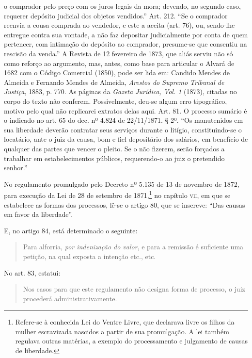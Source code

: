 {  o comprador pelo preço com os juros legais da mora; devendo, no
  segundo caso, requerer depósito judicial dos objetos vendidos.'' Art.
  212. ``Se o comprador reenvia a cousa comprada ao vendedor, e este a
  aceita (art. 76), ou, sendo-lhe entregue contra sua vontade, a não faz
  depositar judicialmente por conta de quem pertencer, com intimação do
  depósito ao comprador, presume-se que consentiu na rescisão da venda.''
  A Revista de 12 fevereiro de 1873, que aliás serviu não só como
  reforço ao argumento, mas, antes, como base para articular o
  Alvará de 1682 com o Código Comercial (1850), pode ser lida em: 
 Candido Mendes de Almeida e Fernando Mendes de Almeida,
 \emph{Arestos do Supremo Tribunal de Justiça}, 1883, p. 770. As páginas da
  \emph{Gazeta Jurídica, Vol. 1} (1873), citadas no corpo do texto não
  conferem. Possivelmente, deu-se algum erro tipográfico, motivo pelo
  qual não replicarei extratos delas aqui. Art. 81. O processo sumário é
  o indicado no art. 65 do dec. nº 4.824 de 22/11/1871. § 2º. ``Os
  manutenidos em sua liberdade deverão contratar seus serviços durante o
  litígio, constituindo-se o locatário, ante o juiz da causa, bom e fiel
  depositário dos salários, em benefício de qualquer das partes que
  vencer o pleito. Se o não fizerem, serão forçados a trabalhar em
  estabelecimentos públicos, requerendo-o ao juiz o pretendido senhor.''}

No regulamento promulgado pelo Decreto nº 5.135 de 13 de novembro de
1872, para execução da Lei de 28 de setembro de 1871,\footnote{
  Refere-se à conhecida Lei do Ventre Livre, que declarava livre os
  filhos da mulher escravizada nascidos a partir de sua promulgação.
  A lei também regulava outras matérias, a exemplo do processamento
  e julgamento de causas de liberdade.} no capítulo \textsc{vii}, em que se
estabelece as formas dos processos, lê-se o artigo 80, que se inscreve:
``Das causas em favor da liberdade''.

E, no artigo 84, está determinado o seguinte:

\begin{quote}
Para alforria, \emph{por indenização do valor}, e para a remissão é
suficiente uma petição, na qual exposta a intenção etc., etc.
\end{quote}

No art. 83, estatui:

\begin{quote}
Nos casos para que este regulamento não designa forma de processo, o
juiz procederá administrativamente.
\end{quote}

